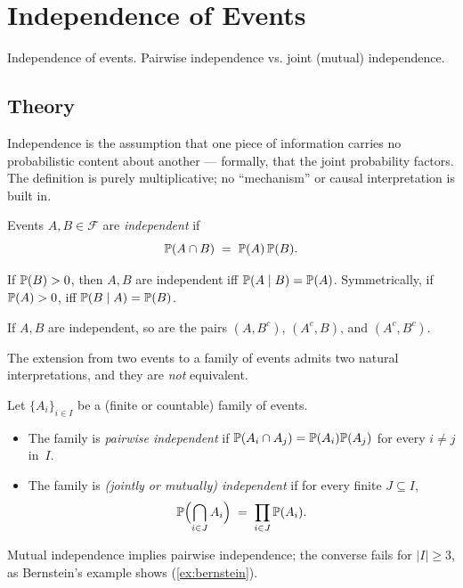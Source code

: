 
\section{Independence of Events}
\label{sec:1.2.04-independence}

\begin{ticket}
Independence of events. Pairwise independence vs. joint (mutual) independence.
\end{ticket}

\subsection*{Theory}

Independence is the assumption that one piece of information carries
no probabilistic content about another — formally, that the joint
probability factors. The definition is purely multiplicative; no
``mechanism'' or causal interpretation is built in.

\begin{definition}
\label{def:indep-two}
Events $A, B \in \mathcal{F}$ are \emph{independent} if
\[
  \mathbb{P}(A \cap B) \;=\; \mathbb{P}(A)\, \mathbb{P}(B).
\]
\end{definition}

\begin{proposition}
\label{prop:indep-conditional}
If $\mathbb{P}(B) > 0$, then $A, B$ are independent iff
$\mathbb{P}(A \mid B) = \mathbb{P}(A)$. Symmetrically, if $\mathbb{P}(A) > 0$, iff
$\mathbb{P}(B \mid A) = \mathbb{P}(B)$.
\end{proposition}

\begin{proposition}
\label{prop:indep-complements}
If $A, B$ are independent, so are the pairs $(A, B^c)$, $(A^c, B)$,
and $(A^c, B^c)$.
\end{proposition}

The extension from two events to a family of events admits two
natural interpretations, and they are \emph{not} equivalent.

\begin{definition}
\label{def:indep-many}
Let $\{A_i\}_{i \in I}$ be a (finite or countable) family of events.
\begin{itemize}
  \item The family is \emph{pairwise independent} if
        $\mathbb{P}(A_i \cap A_j) = \mathbb{P}(A_i) \mathbb{P}(A_j)$ for every
        $i \neq j$ in~$I$.
  \item The family is \emph{(jointly or mutually) independent} if
        for every finite $J \subseteq I$,
        \[
          \mathbb{P}\Bigl(\bigcap_{i \in J} A_i\Bigr) \;=\; \prod_{i \in J} \mathbb{P}(A_i).
        \]
\end{itemize}
Mutual independence implies pairwise independence; the converse
fails for $|I| \geq 3$, as Bernstein's example shows
(\cref{ex:bernstein}).
\end{definition}

